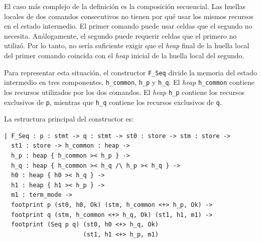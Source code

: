 \documentclass[a4paper,	11pt]{report}
\newif\ifdraft\drafttrue
\newcommand{\comm}[3]{\ifdraft{{\color{#1}[#2: #3]}}\fi}
\newcommand{\guido}[1]{\comm{blue}{Guido}{#1}}
\begin{document}
El caso más complejo de la definición es la composición secuencial.
Las huellas locales de dos comandos consecutivos no tienen por qué usar los mismos recursos en el estado intermedio.
El primer comando puede usar celdas que el segundo no necesita.
Análogamente,
el segundo puede requerir celdas que el primero no utilizó.
Por lo tanto,
no sería suficiente exigir que el \emph{heap} final de la huella local del primer comando coincida con el \emph{heap} inicial de la huella local del segundo.

Para representar esta situación,
el constructor \lstinline|F_Seq| divide la memoria del estado intermedio en tres componentes,
\lstinline|h_common|, \lstinline|h_p| y \lstinline|h_q|.
El \emph{heap} \lstinline|h_common| contiene los recursos utilizados por los dos comandos.
El \emph{heap} \lstinline|h_p| contiene los recursos exclusivos de \lstinline|p|,
mientras que \lstinline|h_q| contiene los recursos exclusivos de \lstinline|q|.

La estructura principal del constructor es:

\begin{lstlisting}
| F_Seq : p : stmt -> q : stmt -> st0 : store -> stm : store ->
  st1 : store -> h_common : heap ->
  h_p : heap { h_common >< h_p } ->
  h_q : heap { h_common >< h_q /\ h_p >< h_q } ->
  h0 : heap { h0 >< h_q } ->
  h1 : heap { h1 >< h_p } ->
  m1 : term_mode ->
  footprint p (st0, h0, Ok) (stm, h_common <+> h_p, Ok) ->
  footprint q (stm, h_common <+> h_q, Ok) (st1, h1, m1) ->
  footprint (Seq p q) (st0, h0 <+> h_q, Ok)
                      (st1, h1 <+> h_p, m1)
\end{lstlisting}
\end{document}
